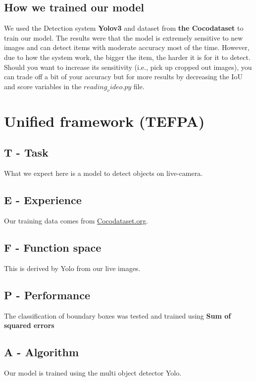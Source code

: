\documentclass{article}
\begin{document}
\subsection{How we trained our model}
\tab We used the Detection system \textbf{Yolov3} and dataset from \textbf{the Cocodataset} to train our model. The results were that the model is extremely sensitive to new images and can detect items with moderate accuracy most of the time. However, due to how the system work, the bigger the item, the harder it is for it to detect.\\
\tab Should you want to increase its sensitivity (i.e., pick up cropped out images), you can trade off a bit of your accuracy but for more results by decreasing the IoU and score variables in the \textbf{$reading_video.py$} file.

\section{Unified framework (TEFPA)}
\subsection{T - Task}
What we expect here is a model to detect objects on live-camera.
\subsection{E - Experience}
Our training data comes from \url{Cocodataset.org}.
\subsection{F - Function space}
This is derived by Yolo from our live images.
\subsection{P - Performance}
The classification of boundary boxes was tested and trained using \textbf{Sum of squared errors}
\subsection{A - Algorithm}
Our model is trained using the multi object detector Yolo.
\end{document}
